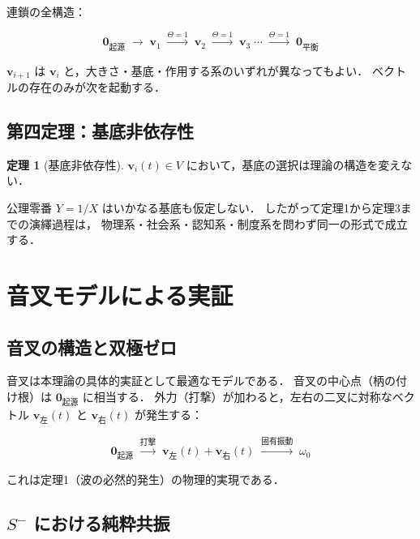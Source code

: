 \documentclass[12pt, a4paper]{article}
\theoremstyle{definition}
\newtheorem{theorem}{定理}
\newcommand{\vorigin}{\mathbf{0}_{\text{起源}}}
\newcommand{\vequil}{\mathbf{0}_{\text{平衡}}}
\newcommand{\Switch}{\Theta}
\begin{document}
連鎖の全構造：

\begin{equation}
  \vorigin \;\to\; \mathbf{v}_1
  \;\xrightarrow{\Switch=1}\; \mathbf{v}_2
  \;\xrightarrow{\Switch=1}\; \mathbf{v}_3
  \;\cdots
  \;\xrightarrow{\Switch=1}\; \vequil
  \label{eq:chain_full}
\end{equation}

$\mathbf{v}_{i+1}$ は $\mathbf{v}_i$ と，大きさ・基底・作用する系のいずれが異なってもよい．
ベクトルの存在のみが次を起動する．

\subsection{第四定理：基底非依存性}

\begin{theorem}[基底非依存性]
  $\mathbf{v}_i(t) \in V$ において，基底の選択は理論の構造を変えない．
\end{theorem}

公理零番 $Y = 1/X$ はいかなる基底も仮定しない．
したがって定理1から定理3までの演繹過程は，
物理系・社会系・認知系・制度系を問わず同一の形式で成立する．

\section{音叉モデルによる実証}

\subsection{音叉の構造と双極ゼロ}

音叉は本理論の具体的実証として最適なモデルである．
音叉の中心点（柄の付け根）は $\vorigin$ に相当する．
外力（打撃）が加わると，左右の二叉に対称なベクトル
$\mathbf{v}_{\text{左}}(t)$ と $\mathbf{v}_{\text{右}}(t)$ が発生する：

\begin{equation}
  \vorigin
  \;\xrightarrow{\text{打撃}}\;
  \mathbf{v}_{\text{左}}(t) + \mathbf{v}_{\text{右}}(t)
  \;\xrightarrow{\text{固有振動}}\;
  \omega_0
\end{equation}

これは定理1（波の必然的発生）の物理的実現である．

\subsection{$S^-$ における純粋共振}
\end{document}
